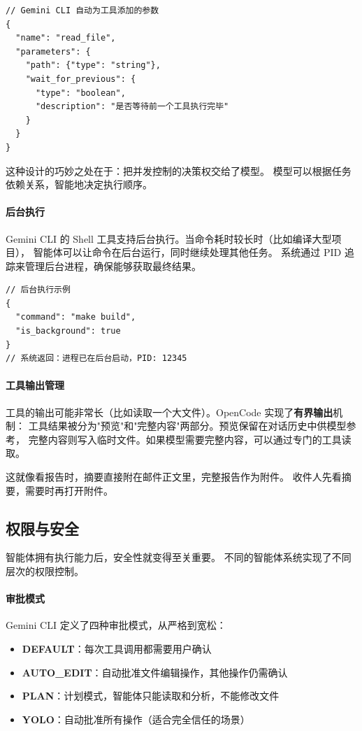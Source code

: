 \begin{verbatim}
// Gemini CLI 自动为工具添加的参数
{
  "name": "read_file",
  "parameters": {
    "path": {"type": "string"},
    "wait_for_previous": {
      "type": "boolean",
      "description": "是否等待前一个工具执行完毕"
    }
  }
}
\end{verbatim}

这种设计的巧妙之处在于：把并发控制的决策权交给了模型。
模型可以根据任务依赖关系，智能地决定执行顺序。

\paragraph{后台执行}
Gemini CLI 的 Shell 工具支持后台执行。当命令耗时较长时（比如编译大型项目），
智能体可以让命令在后台运行，同时继续处理其他任务。
系统通过 PID 追踪来管理后台进程，确保能够获取最终结果。

\begin{verbatim}
// 后台执行示例
{
  "command": "make build",
  "is_background": true
}
// 系统返回：进程已在后台启动，PID: 12345
\end{verbatim}

\paragraph{工具输出管理}
工具的输出可能非常长（比如读取一个大文件）。OpenCode 实现了\textbf{有界输出}机制：
工具结果被分为"预览"和"完整内容"两部分。预览保留在对话历史中供模型参考，
完整内容则写入临时文件。如果模型需要完整内容，可以通过专门的工具读取。

这就像看报告时，摘要直接附在邮件正文里，完整报告作为附件。
收件人先看摘要，需要时再打开附件。

\subsection{权限与安全}

智能体拥有执行能力后，安全性就变得至关重要。
不同的智能体系统实现了不同层次的权限控制。

\paragraph{审批模式}
Gemini CLI 定义了四种审批模式，从严格到宽松：

\begin{itemize}
    \item \textbf{DEFAULT}：每次工具调用都需要用户确认
    \item \textbf{AUTO\_EDIT}：自动批准文件编辑操作，其他操作仍需确认
    \item \textbf{PLAN}：计划模式，智能体只能读取和分析，不能修改文件
    \item \textbf{YOLO}：自动批准所有操作（适合完全信任的场景）
\end{itemize}

